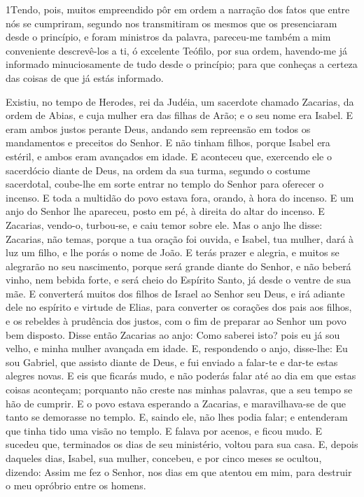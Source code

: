 
\lettrine{1} Tendo, pois, muitos empreendido pôr em ordem a
narração dos fatos que entre nós se cumpriram, segundo nos
transmitiram os mesmos que os presenciaram desde o princípio, e
foram ministros da palavra, pareceu-me também a mim conveniente
descrevê-los a ti, ó excelente Teófilo, por sua ordem, havendo-me já
informado minuciosamente de tudo desde o princípio; para que
conheças a certeza das coisas de que já estás informado.

Existiu, no tempo de Herodes, rei da Judéia, um sacerdote chamado
Zacarias, da ordem de Abias, e cuja mulher era das filhas de Arão; e
o seu nome era Isabel. E eram ambos justos perante Deus, andando
sem repreensão em todos os mandamentos e preceitos do Senhor. E
não tinham filhos, porque Isabel era estéril, e ambos eram avançados
em idade. E aconteceu que, exercendo ele o sacerdócio diante de
Deus, na ordem da sua turma, segundo o costume sacerdotal,
coube-lhe em sorte entrar no templo do Senhor para oferecer o
incenso. E toda a multidão do povo estava fora, orando, à
hora do incenso. E um anjo do Senhor lhe apareceu, posto em
pé, à direita do altar do incenso. E Zacarias, vendo-o,
turbou-se, e caiu temor sobre ele. Mas o anjo lhe disse:
Zacarias, não temas, porque a tua oração foi ouvida, e Isabel, tua
mulher, dará à luz um filho, e lhe porás o nome de João. E
terás prazer e alegria, e muitos se alegrarão no seu nascimento,
porque será grande diante do Senhor, e não beberá vinho, nem
bebida forte, e será cheio do Espírito Santo, já desde o ventre de
sua mãe. E converterá muitos dos filhos de Israel ao Senhor
seu Deus, e irá adiante dele no espírito e virtude de Elias,
para converter os corações dos pais aos filhos, e os rebeldes à
prudência dos justos, com o fim de preparar ao Senhor um povo bem
disposto. Disse então Zacarias ao anjo: Como saberei isto?
pois eu já sou velho, e minha mulher avançada em idade. E,
respondendo o anjo, disse-lhe: Eu sou Gabriel, que assisto diante de
Deus, e fui enviado a falar-te e dar-te estas alegres novas.
E eis que ficarás mudo, e não poderás falar até ao dia em que
estas coisas aconteçam; porquanto não creste nas minhas palavras,
que a seu tempo se hão de cumprir. E o povo estava esperando
a Zacarias, e maravilhava-se de que tanto se demorasse no templo.
E, saindo ele, não lhes podia falar; e entenderam que tinha
tido uma visão no templo. E falava por acenos, e ficou mudo.
E sucedeu que, terminados os dias de seu ministério, voltou
para sua casa. E, depois daqueles dias, Isabel, sua mulher,
concebeu, e por cinco meses se ocultou, dizendo: Assim me fez
o Senhor, nos dias em que atentou em mim, para destruir o meu
opróbrio entre os homens.

